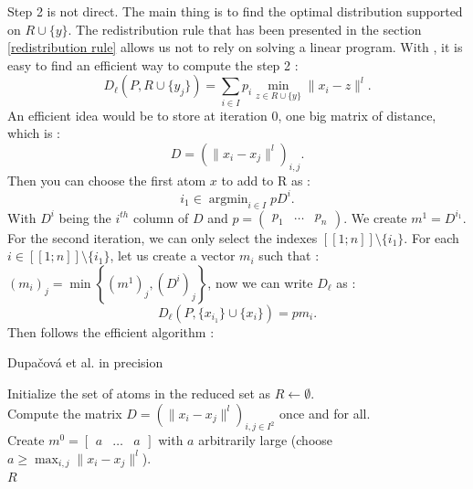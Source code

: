 \documentclass{amsart}
\newcommand{\argmin}{\mathop{\arg\min}}
\begin{document}
\noindent Step 2 is not direct. The main thing is to find the optimal distribution supported on $R\cup\{y\}$. The redistribution rule that has been presented in the section \ref{redistribution rule} allows us not to rely on solving a linear program. With , it is easy to find an efficient way to compute the step 2 : 
$$
D_\ell\left(P,R\cup \{y_j\}\right)=\sum_{i\in I}p_i\min_{z\in R\cup\{y\}}\lVert x_i-z \rVert^l.
$$
An efficient idea would be to store at iteration $0$, one big matrix of distance, which is : 
$$
D = \left(\lVert x_i-x_j\rVert ^l \right)_{i,j}.
$$
Then you can choose the first atom $x$ to add to R as :
$$
i_1 \in \argmin_{i\in I} pD^i.
$$
With $D^i$ being the $i^{th}$ column of $D$ and $p=\begin{pmatrix}
    p_1 & \hdots & p_n
\end{pmatrix}$.
We create $m^1=D^{i_1}$. For the second iteration, we can only select the indexes $[\![1;n]\!]\setminus \{i_1\}$. For each $i \in [\![1;n]\!]\setminus \{i_1\}$, let us create a vector $m_i$ such that : $\left(m_i\right)_j=\min\left\{\left(m^1\right)_j,\left(D^i\right)_j\right\}$, now we can write $D_\ell$ as : $$
D_\ell\left(P,\{x_{i_1}\}\cup \{x_i\}\right)=pm_i.
$$
Then follows the efficient algorithm :
\begin{algorithm}
\caption{Dupačová et al. in precision}
Initialize the set of atoms in the reduced set as $R \gets \emptyset$.\\
Compute the matrix $D = \left(\| x_i - x_j \|^l \right)_{i,j \in I^2}$ once and for all.\\
Create $m^0 = \begin{bmatrix} a & \hdots & a \end{bmatrix}$ with $a$ arbitrarily large (choose $a \geq \max_{i,j} \| x_i - x_j \|^l$).\\
\Return $R$\\
\end{algorithm}
\end{document}
